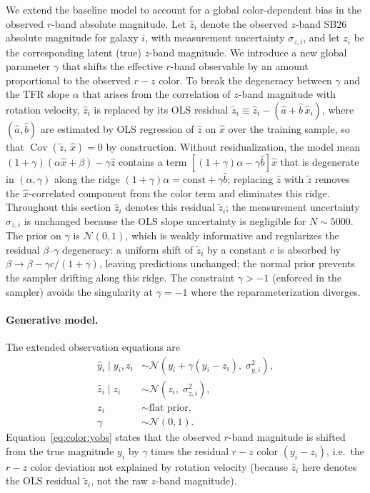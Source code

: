 We extend the baseline model to account for a global color-dependent
bias in the observed $r$-band absolute magnitude.
Let $\hat{z}_i$ denote the observed $z$-band SB26 absolute magnitude
for galaxy $i$, with measurement uncertainty $\sigma_{z,i}$, and let $z_i$
be the corresponding latent (true) $z$-band magnitude.
We introduce a new global parameter $\gamma$ that shifts the effective
$r$-band observable by an amount proportional to the observed $r-z$ color.
To break the degeneracy between $\gamma$ and the TFR slope $\alpha$ that arises from the correlation of $z$-band magnitude with rotation velocity, $\hat{z}_i$ is replaced by its OLS residual $\tilde{z}_i \equiv \hat{z}_i - (\hat{a} + \hat{b}\,\hat{x}_i)$, where $(\hat{a},\hat{b})$ are estimated by OLS regression of $\hat{z}$ on $\hat{x}$ over the training sample, so that $\operatorname{Cov}(\tilde{z},\,\hat{x})=0$ by construction.
Without residualization, the model mean $(1+\gamma)(\alpha\hat{x}+\beta)-\gamma\hat{z}$ contains a term $[(1+\gamma)\alpha - \gamma\hat{b}]\hat{x}$ that is degenerate in $(\alpha,\gamma)$ along the ridge $(1+\gamma)\alpha = \mathrm{const} + \gamma\hat{b}$; replacing $\hat{z}$ with $\tilde{z}$ removes the $\hat{x}$-correlated component from the color term and eliminates this ridge.
Throughout this section $\hat{z}_i$ denotes this residual $\tilde{z}_i$; the measurement uncertainty $\sigma_{z,i}$ is unchanged because the OLS slope uncertainty is negligible for $N\sim 5000$.
The prior on $\gamma$ is $\mathcal{N}(0,1)$, which is weakly informative and regularizes the residual $\beta$--$\gamma$ degeneracy: a uniform shift of $\tilde{z}_i$ by a constant $c$ is absorbed by $\beta \to \beta - \gamma c/(1+\gamma)$, leaving predictions unchanged; the normal prior prevents the sampler drifting along this ridge.
The constraint $\gamma > -1$ (enforced in the sampler) avoids the singularity at $\gamma=-1$ where the reparameterization diverges.

\paragraph{Generative model.}
The extended observation equations are
\begin{align}
\hat{y}_i \mid y_i, z_i &\sim \mathcal{N}\!\left(y_i + \gamma(y_i - z_i),\;\sigma_{y,i}^2\right), \label{eq:color:yobs}\\
\hat{z}_i \mid z_i &\sim \mathcal{N}\!\left(z_i,\;\sigma_{z,i}^2\right), \label{eq:color:zobs}\\
z_i &\sim \text{flat prior},\\
\gamma &\sim \mathcal{N}(0, 1).
\end{align}
Equation~\eqref{eq:color:yobs} states that the observed $r$-band magnitude
is shifted from the true magnitude $y_i$ by $\gamma$ times the residual
$r-z$ color $(y_i - z_i)$, i.e.\ the $r-z$ color deviation not explained
by rotation velocity (because $\hat{z}_i$ here denotes the OLS residual
$\tilde{z}_i$, not the raw $z$-band magnitude).

